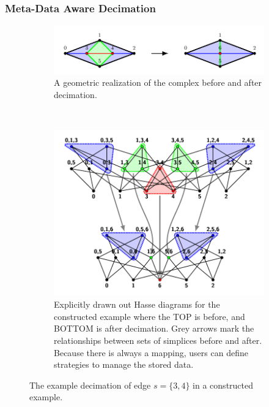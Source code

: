 	\subsubsection{Meta-Data Aware Decimation}
		\begin{figure}[ht!]
			\centering
			\begin{subfigure}[ht!]{0.7\textwidth}
				\includegraphics[width=\textwidth]{Figures/decimation/decimation}
				\caption{
					A geometric realization of the complex before and after decimation.
				}
				\label{fig:decexample}
			\end{subfigure}\\
			\begin{subfigure}[ht!]{0.7\textwidth}
				\includegraphics[width=\textwidth]{Figures/decdetail/decdetail}
				\caption{
					Explicitly drawn out Hasse diagrams for the constructed example where the TOP is before, and BOTTOM is after decimation. Grey arrows mark the relationships between sets of simplices before and after. Because there is always a mapping, users can define strategies to manage the stored data.
				}
				\label{fig:decdetail}
			\end{subfigure}
			\caption[Example decimation of an edge in \asc]{The example decimation of edge $s = \{3,4\}$ in a constructed example.}
			\label{fig:decimation}
		\end{figure}


